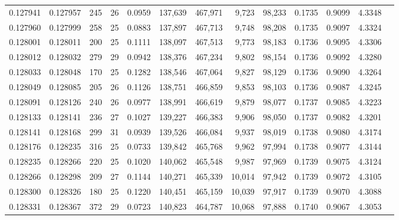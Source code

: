 \begin{tabular}{rrrrrrrrrrrrr}
0.127941 & 0.127957 &   245 &  26 &                                     0.0959 & 137,639 & 467,971 &   9,723 &  98,233 & 0.1735 & 0.9099 & 4.3348 \\
0.127960 & 0.127999 &   258 &  25 &                                     0.0883 & 137,897 & 467,713 &   9,748 &  98,208 & 0.1735 & 0.9097 & 4.3324 \\
0.128001 & 0.128011 &   200 &  25 &                                     0.1111 & 138,097 & 467,513 &   9,773 &  98,183 & 0.1736 & 0.9095 & 4.3306 \\
0.128012 & 0.128032 &   279 &  29 &                                     0.0942 & 138,376 & 467,234 &   9,802 &  98,154 & 0.1736 & 0.9092 & 4.3280 \\
0.128033 & 0.128048 &   170 &  25 &                                     0.1282 & 138,546 & 467,064 &   9,827 &  98,129 & 0.1736 & 0.9090 & 4.3264 \\
0.128049 & 0.128085 &   205 &  26 &                                     0.1126 & 138,751 & 466,859 &   9,853 &  98,103 & 0.1736 & 0.9087 & 4.3245 \\
0.128091 & 0.128126 &   240 &  26 &                                     0.0977 & 138,991 & 466,619 &   9,879 &  98,077 & 0.1737 & 0.9085 & 4.3223 \\
0.128133 & 0.128141 &   236 &  27 &                                     0.1027 & 139,227 & 466,383 &   9,906 &  98,050 & 0.1737 & 0.9082 & 4.3201 \\
0.128141 & 0.128168 &   299 &  31 &                                     0.0939 & 139,526 & 466,084 &   9,937 &  98,019 & 0.1738 & 0.9080 & 4.3174 \\
0.128176 & 0.128235 &   316 &  25 &                                     0.0733 & 139,842 & 465,768 &   9,962 &  97,994 & 0.1738 & 0.9077 & 4.3144 \\
0.128235 & 0.128266 &   220 &  25 &                                     0.1020 & 140,062 & 465,548 &   9,987 &  97,969 & 0.1739 & 0.9075 & 4.3124 \\
0.128266 & 0.128298 &   209 &  27 &                                     0.1144 & 140,271 & 465,339 &  10,014 &  97,942 & 0.1739 & 0.9072 & 4.3105 \\
0.128300 & 0.128326 &   180 &  25 &                                     0.1220 & 140,451 & 465,159 &  10,039 &  97,917 & 0.1739 & 0.9070 & 4.3088 \\
0.128331 & 0.128367 &   372 &  29 &                                     0.0723 & 140,823 & 464,787 &  10,068 &  97,888 & 0.1740 & 0.9067 & 4.3053 \\

\end{tabular}
